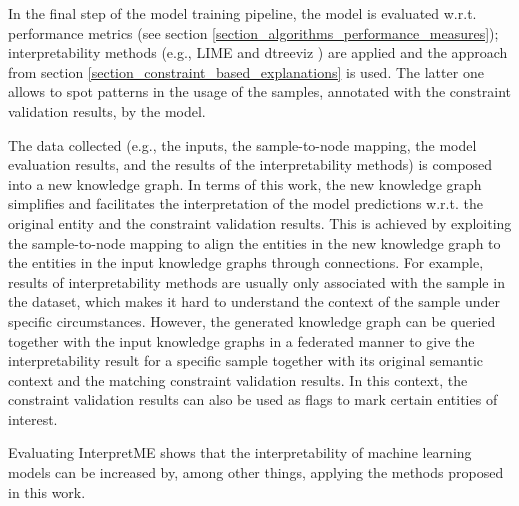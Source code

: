 In the final step of the model training pipeline, the model is evaluated w.r.t. performance metrics (see section \ref{section_algorithms_performance_measures}); interpretability methods (e.g., LIME \cite{ribeiro2016should} and dtreeviz \cite{dtreeviz}) are applied and the approach from section \ref{section_constraint_based_explanations} is used. The latter one allows to spot patterns in the usage of the samples, annotated with the constraint validation results, by the model.

The data collected (e.g., the inputs, the sample-to-node mapping, the model evaluation results, and the results of the interpretability methods) is composed into a new knowledge graph. In terms of this work, the new knowledge graph simplifies and facilitates the interpretation of the model predictions w.r.t. the original entity and the constraint validation results. This is achieved by exploiting the sample-to-node mapping to align the entities in the new knowledge graph to the entities in the input knowledge graphs through  connections. For example, results of interpretability methods are usually only associated with the sample in the dataset, which makes it hard to understand the context of the sample under specific circumstances. However, the generated knowledge graph can be queried together with the input knowledge graphs in a federated manner to give the interpretability result for a specific sample together with its original semantic context and the matching constraint validation results. In this context, the constraint validation results can also be used as flags to mark certain entities of interest.

Evaluating InterpretME shows that the interpretability of machine learning models can be increased by, among other things, applying the methods proposed in this work.



